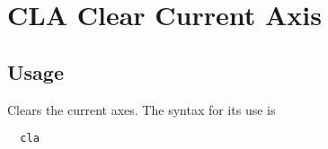 \section{CLA Clear Current Axis}

\subsection{Usage}

Clears the current axes.  The syntax for its use is
\begin{verbatim}
  cla
\end{verbatim}
